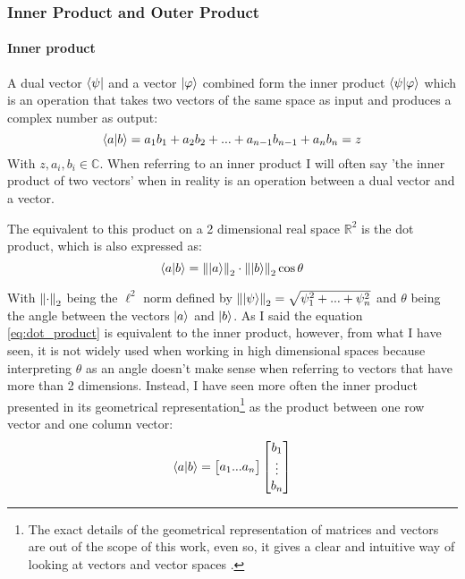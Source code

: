 \subsubsection{Inner Product and Outer Product}

\paragraph{Inner product}
A dual vector $\bra{\psi}$ and a vector $\ket{\varphi}$ combined form the inner product $\bra{\psi}\ket{\varphi}$ which is an operation that 
takes two vectors of the same space as input and produces a complex number as output:
$$
\bra{a}\ket{b} = a_1 b_1 + a_2 b_2 + ... + a_{n-1} b_{n-1} + a_n b_n = z
$$
With $z, a_i, b_i \in \mathbb{C}$. When referring to an inner product I will often say 'the inner product of two vectors' when in reality is an operation between a dual vector and a vector.

The equivalent to this product on a 2 dimensional real space $\mathbb{R}^2$ is the dot product, which is also expressed as: 
\begin{equation}
	\bra{a}\ket{b} = \norm{\ket{a}}_2 \cdot \norm{\ket{b}}_2 \cos \theta 
	\label{eq:dot_product}
\end{equation}


With $\norm{\cdot}_2$ being the $\ell^2$  norm defined by $\norm{\ket{\psi}}_2 = \sqrt{\psi_{1}^2 + ... + \psi_{n}^2}$ and $\theta$ being the angle between the vectors $\ket{a}$ and $\ket{b}$. As I said the equation \eqref{eq:dot_product} is equivalent to the inner product, however, from what I have seen, it is not widely used when working in high dimensional spaces because interpreting $\theta$ as an angle doesn't make sense when referring to vectors that have more than 2 dimensions. Instead, I have seen more often the inner product presented in its geometrical representation\footnote{The exact details of the geometrical representation of matrices and vectors are out of the scope of this work, even so, it gives a clear and intuitive way of looking at vectors and vector spaces \tocite.} as the product between one row vector and one column vector: 
$$
\bra{a}\ket{b} = \begin{bmatrix}a_1  ...  a_n \end{bmatrix} \begin{bmatrix} b_{1} \\ \vdots \\ b_{n} \end{bmatrix}
$$


